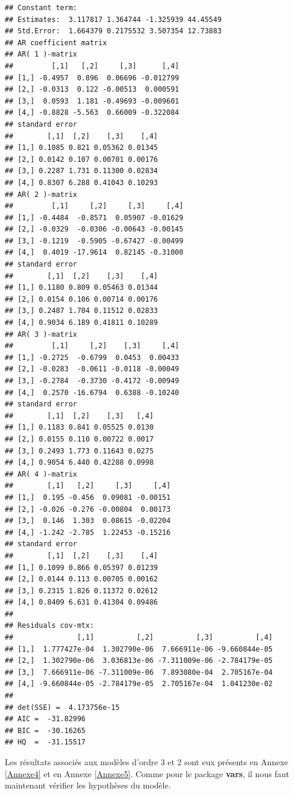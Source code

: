 \documentclass[11pt,]{article}
\begin{document}
\begin{verbatim}
## Constant term: 
## Estimates:  3.117817 1.364744 -1.325939 44.45549 
## Std.Error:  1.664379 0.2175532 3.507354 12.73883 
## AR coefficient matrix 
## AR( 1 )-matrix 
##         [,1]   [,2]     [,3]      [,4]
## [1,] -0.4957  0.896  0.06696 -0.012799
## [2,] -0.0313  0.122 -0.00513  0.000591
## [3,]  0.0593  1.181 -0.49693 -0.009601
## [4,] -0.8828 -5.563  0.66009 -0.322084
## standard error 
##        [,1]  [,2]    [,3]    [,4]
## [1,] 0.1085 0.821 0.05362 0.01345
## [2,] 0.0142 0.107 0.00701 0.00176
## [3,] 0.2287 1.731 0.11300 0.02834
## [4,] 0.8307 6.288 0.41043 0.10293
## AR( 2 )-matrix 
##         [,1]     [,2]     [,3]     [,4]
## [1,] -0.4484  -0.8571  0.05907 -0.01629
## [2,] -0.0329  -0.0306 -0.00643 -0.00145
## [3,] -0.1219  -0.5905 -0.67427 -0.00499
## [4,]  0.4019 -17.9614  0.82145 -0.31000
## standard error 
##        [,1]  [,2]    [,3]    [,4]
## [1,] 0.1180 0.809 0.05463 0.01344
## [2,] 0.0154 0.106 0.00714 0.00176
## [3,] 0.2487 1.704 0.11512 0.02833
## [4,] 0.9034 6.189 0.41811 0.10289
## AR( 3 )-matrix 
##         [,1]     [,2]    [,3]     [,4]
## [1,] -0.2725  -0.6799  0.0453  0.00433
## [2,] -0.0283  -0.0611 -0.0118 -0.00049
## [3,] -0.2784  -0.3730 -0.4172 -0.00949
## [4,]  0.2570 -16.6794  0.6388 -0.10240
## standard error 
##        [,1]  [,2]    [,3]   [,4]
## [1,] 0.1183 0.841 0.05525 0.0130
## [2,] 0.0155 0.110 0.00722 0.0017
## [3,] 0.2493 1.773 0.11643 0.0275
## [4,] 0.9054 6.440 0.42288 0.0998
## AR( 4 )-matrix 
##        [,1]   [,2]     [,3]     [,4]
## [1,]  0.195 -0.456  0.09081 -0.00151
## [2,] -0.026 -0.276 -0.00804  0.00173
## [3,]  0.146  1.303  0.08615 -0.02204
## [4,] -1.242 -2.785  1.22453 -0.15216
## standard error 
##        [,1]  [,2]    [,3]    [,4]
## [1,] 0.1099 0.866 0.05397 0.01239
## [2,] 0.0144 0.113 0.00705 0.00162
## [3,] 0.2315 1.826 0.11372 0.02612
## [4,] 0.8409 6.631 0.41304 0.09486
##   
## Residuals cov-mtx: 
##               [,1]          [,2]          [,3]          [,4]
## [1,]  1.777427e-04  1.302790e-06  7.666911e-06 -9.660844e-05
## [2,]  1.302790e-06  3.036813e-06 -7.311009e-06 -2.784179e-05
## [3,]  7.666911e-06 -7.311009e-06  7.893080e-04  2.705167e-04
## [4,] -9.660844e-05 -2.784179e-05  2.705167e-04  1.041230e-02
##   
## det(SSE) =  4.173756e-15 
## AIC =  -31.82996 
## BIC =  -30.16265 
## HQ  =  -31.15517
\end{verbatim}

Les résultats associés aux modèles d'ordre 3 et 2 sont eux présents en
Annexe \ref{Annexe4} et en Annexe \ref{Annexe5}. Comme pour le package
\textbf{vars}, il nous faut maintenant vérifier les hypothèses du
modèle.
\end{document}

